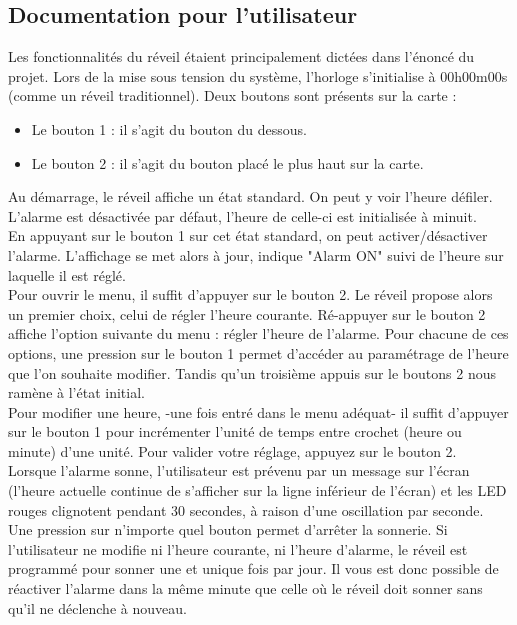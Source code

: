 \subsection*{Documentation pour l'utilisateur}
Les fonctionnalités du réveil étaient principalement dictées dans l'énoncé du projet. Lors de la mise sous tension du système, l'horloge s'initialise à 00h00m00s (comme un réveil traditionnel). Deux boutons sont présents sur la carte : 
\begin{itemize}
\item Le bouton 1 : il s'agit du bouton du dessous. 
\item Le bouton 2 : il s'agit du bouton placé le plus haut sur la carte.
\end{itemize}
Au démarrage, le réveil affiche un état standard. On peut y voir l'heure défiler. L'alarme est désactivée par défaut, l'heure de celle-ci est initialisée à minuit. \\
En appuyant sur le bouton 1 sur cet état standard, on peut activer/désactiver l'alarme. L'affichage se met alors à jour, indique "Alarm ON" suivi de l'heure sur laquelle il est réglé.\\
Pour ouvrir le menu, il suffit d'appuyer sur le bouton 2. Le réveil propose alors un premier choix, celui de régler l'heure courante. Ré-appuyer sur le bouton 2 affiche l'option suivante du menu : régler l'heure de l'alarme. Pour chacune de ces options, une pression sur le bouton 1 permet d'accéder au paramétrage de l'heure que l'on souhaite modifier. Tandis qu'un troisième appuis sur le boutons 2 nous ramène à l'état initial.\\

Pour modifier une heure, -une fois entré dans le menu adéquat- il suffit d'appuyer sur le bouton 1 pour incrémenter l'unité de temps entre crochet (heure ou minute) d'une unité. Pour valider votre réglage, appuyez sur le bouton 2.\\

Lorsque l'alarme sonne, l'utilisateur est prévenu par un message sur l'écran (l'heure actuelle continue de s'afficher sur la ligne inférieur de l'écran) et les LED rouges clignotent pendant 30 secondes, à raison d'une oscillation par seconde. Une pression sur n'importe quel bouton permet d'arr\^{e}ter la sonnerie. Si l'utilisateur ne modifie ni l'heure courante, ni l'heure d'alarme, le réveil est programmé pour sonner une et unique fois par jour. Il vous est donc possible de réactiver l'alarme dans la m\^{e}me minute que celle où le réveil doit sonner sans qu'il ne déclenche à nouveau. \\

